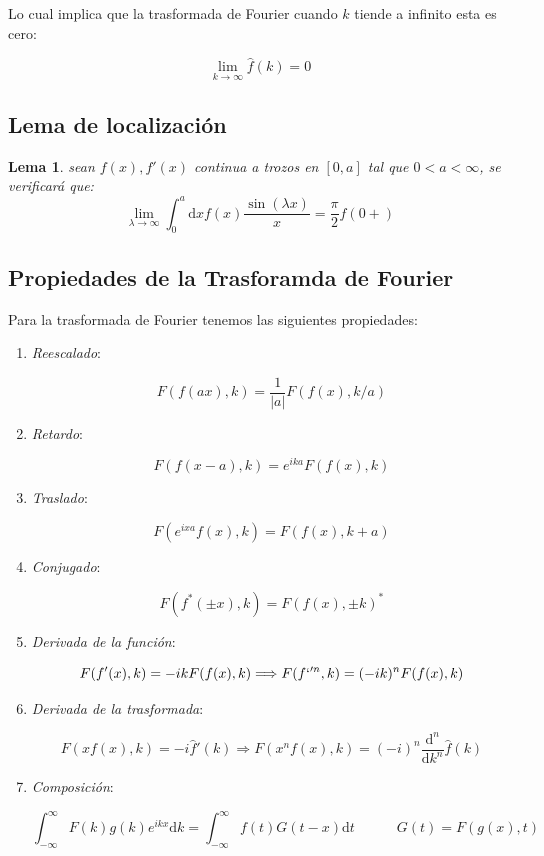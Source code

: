 \documentclass[12pt]{book}
\newcommand{\D}{\mathrm{d}}
\newcommand{\inti}{\int_{-\infty}^{\infty}}
\newcommand{\hatf}{\widehat{f}}
\newcommand{\tquad}{\quad  \quad \quad}
\newtheorem{lemma}{Lema}[section]
\begin{document}
Lo cual implica que la trasformada de Fourier cuando $k$ tiende a infinito esta es cero:

\begin{equation}
 \lim_{k \rightarrow \infty} \hatf (k) = 0 
\end{equation}

\subsection{Lema de localización}

\begin{lemma}
sean $f(x), f'(x)$ continua a trozos en $[0,a]$ tal que $0<a<\infty$, se verificará que:
$$ \lim_{\lambda  \rightarrow \infty} \int_ 0^a \D x f(x) \dfrac{\sin (\lambda x)}{x} = \dfrac{\pi}{2} f(0+) $$
\end{lemma}


\subsection{Propiedades de la Trasforamda de Fourier}

Para la trasformada de Fourier tenemos las siguientes propiedades:

\begin{enumerate}

\item \textit{Reescalado}:

$$ F(f(ax),k) = \dfrac{1}{|a|} F(f(x),k/a) $$

\item \textit{Retardo}:

$$ F(f(x-a),k) = e^{ika} F(f(x),k) $$

\item \textit{Traslado}:

$$ F(e^{ixa} f(x),k) = F(f(x),k+a) $$

\item \textit{Conjugado}:

$$ F(f^* (\pm x), k) = F(f(x), \pm k)^* $$

\item \textit{Derivada de la función}:

$$ F(f'(x),k) = - ik F(f(x),k)  \Longrightarrow F(f`'^{n},k) = (-ik)^n F(f(x),k) $$

\item \textit{Derivada de la trasformada}:

$$ F(x f(x), k) = -i \hatf'(k) \Longrightarrow F(x^n f(x), k) = (-i)^n \dfrac{\D^n}{\D k^n} \hatf (k) $$

\item \textit{Composición}:

$$ \inti F(k) g(k) e^{ikx} \D k = \inti f(t) G(t-x) \D t \tquad G(t) = F(g(x),t) $$

\end{enumerate}
\end{document}
